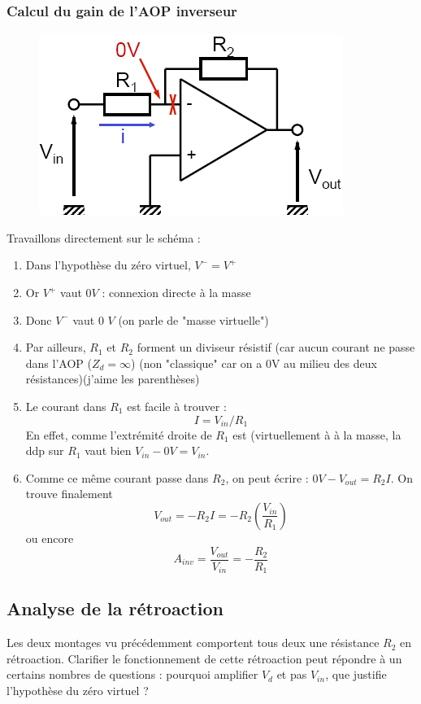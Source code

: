 \documentclass	[11pt, a4paper, openany]{book}
\begin{document}
\subsubsection{Calcul du gain de l'AOP inverseur}
\begin{figure}
\includegraphics[scale=0.35]{img/image50}
\end{figure}
Travaillons directement sur le schéma :
\begin{enumerate}
\item Dans l'hypothèse du zéro virtuel, $V^- = V^+$
\item Or $V^+$ vaut $0V$ : connexion directe à la masse
\item Donc $V^-$ vaut 0 $V$ (on parle de "masse virtuelle")
\item Par ailleurs, $R_1$ et $R_2$ forment un diviseur résistif (car aucun courant ne passe dans l'AOP ($Z_d = \infty$) (non "classique" car on a 0V au milieu des deux résistances)(j'aime les parenthèses)
\item Le courant dans $R_1$ est facile à trouver :
\begin{equation}
I = V_{in}/R_1
\end{equation}
En effet, comme l'extrémité droite de $R_1$ est (virtuellement à à la masse, la ddp sur $R_1$ vaut bien $V_{in}-0V = V_{in}$.
\item Comme ce même courant passe dans $R_2$, on peut écrire : $0V-V_{out} = R_2I$. On trouve finalement
\begin{equation}
V_{out} = -R_2I = -R_2\left(\frac{V_{in}}{R_1}\right)
\end{equation}
ou encore
\begin{equation}
A_{inv} = \frac{V_{out}}{V_{in}} = - \frac{R_2}{R_1}
\end{equation}
\end{enumerate}


\subsection{Analyse de la rétroaction}
Les deux montages vu précédemment comportent tous deux une résistance $R_2$ en rétroaction. Clarifier le fonctionnement de cette rétroaction peut répondre à un certains nombres de questions : pourquoi amplifier $V_d$ et pas $V_{in}$, que justifie l'hypothèse du zéro virtuel ?
\end{document}
